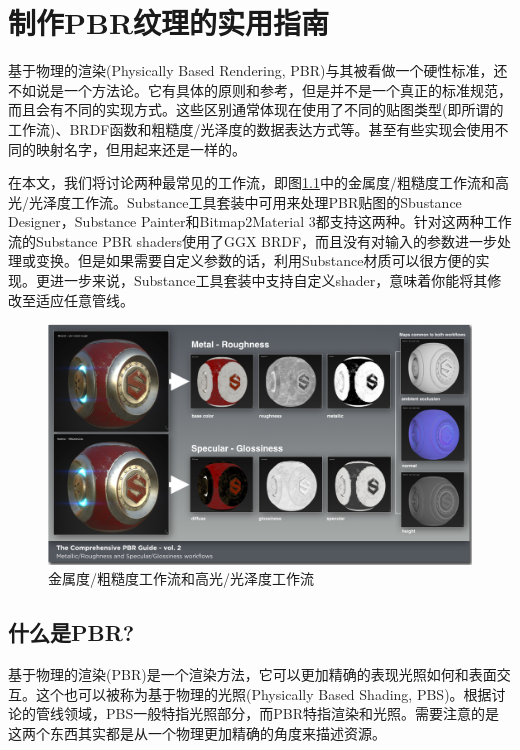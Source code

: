 \chapter{制作PBR纹理的实用指南}

基于物理的渲染(Physically Based Rendering, PBR)与其被看做一个硬性标准，还不如说是一个方法论。它有具体的原则和参考，但是并不是一个真正的标准规范，而且会有不同的实现方式。这些区别通常体现在使用了不同的贴图类型(即所谓的工作流)、BRDF函数和粗糙度/光泽度的数据表达方式等。甚至有些实现会使用不同的映射名字，但用起来还是一样的。

在本文，我们将讨论两种最常见的工作流，即图\ref{fig:chap2_1}中的金属度/粗糙度工作流和高光/光泽度工作流。Substance工具套装中可用来处理PBR贴图的Sbustance Designer，Substance Painter和Bitmap2Material 3都支持这两种。针对这两种工作流的Substance PBR shaders使用了GGX BRDF，而且没有对输入的参数进一步处理或变换。但是如果需要自定义参数的话，利用Substance材质可以很方便的实现。更进一步来说，Substance工具套装中支持自定义shader，意味着你能将其修改至适应任意管线。

\begin{figure}[ht]
    \centering
	\includegraphics[width=\textwidth]{images/chap2_1.png}
	\caption{金属度/粗糙度工作流和高光/光泽度工作流}
    \label{fig:chap2_1}
\end{figure}

\section{什么是PBR?}

基于物理的渲染(PBR)是一个渲染方法，它可以更加精确的表现光照如何和表面交互。这个也可以被称为基于物理的光照(Physically Based Shading, PBS)。根据讨论的管线领域，PBS一般特指光照部分，而PBR特指渲染和光照。需要注意的是这两个东西其实都是从一个物理更加精确的角度来描述资源。

